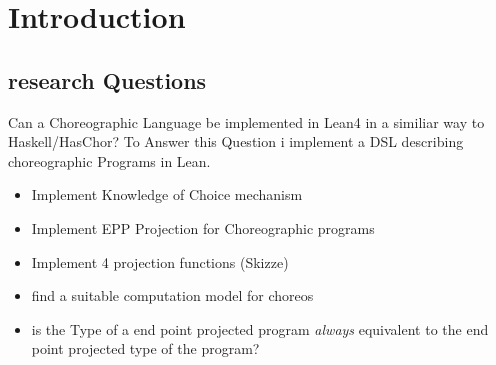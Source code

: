 \chapter{Introduction}
\label{ch:introduction}
\section{research Questions}

Can a Choreographic Language be implemented in Lean4 in a similiar way to Haskell/HasChor? To Answer this Question i implement a DSL describing choreographic Programs in Lean.
\begin{itemize}
  \item Implement Knowledge of Choice mechanism
  \item Implement EPP Projection for Choreographic programs
  \item Implement 4 projection functions (Skizze)
  \item find a suitable computation model for choreos
  \item is the Type of a end point projected program \emph{always} equivalent to the end point projected type of the program?
\end{itemize}

%

